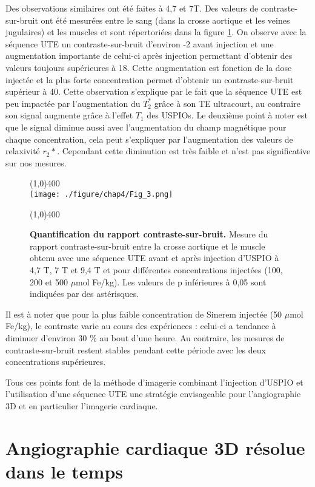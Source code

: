 Des observations similaires ont été faites à 4,7 et 7T. Des valeurs de contraste-sur-bruit ont été mesurées entre le sang (dans la crosse aortique et les veines jugulaires) et les muscles et sont répertoriées dans la figure \ref{fig:contraste-sur-bruitUteFlash}. On observe avec la séquence UTE un contraste-sur-bruit d'environ -2 avant injection et une augmentation importante de celui-ci après injection permettant d'obtenir des valeurs toujours supérieures à 18. Cette augmentation est fonction de la dose injectée et la plus forte concentration permet d'obtenir un contraste-sur-bruit supérieur à 40. Cette observation s'explique par le fait que la séquence UTE est peu impactée par l'augmentation du $T_2^*$ grâce à son TE ultracourt, au contraire son signal augmente grâce à l'effet $T_1$ des USPIOs.
Le deuxième point à noter est que le signal diminue aussi avec l'augmentation du champ magnétique pour chaque concentration, cela peut s'expliquer par l'augmentation des valeurs de relaxivité $r_2*$. Cependant cette diminution est très faible et n'est pas significative sur nos mesures.

\begin{figure}[H]
\centering
\line(1,0){400} \\
\texttt{[image: ./figure/chap4/Fig\_3.png]}
\caption[Quantification du rapport contraste-sur-bruit.]{\label{fig:contraste-sur-bruitUteFlash} \textbf{Quantification du rapport contraste-sur-bruit.} Mesure du rapport contraste-sur-bruit entre la crosse aortique et le muscle obtenu avec une séquence UTE avant et après injection d'USPIO à 4,7 T, 7 T et 9,4 T et pour différentes concentrations injectées (100, 200 et 500 $\mu$mol Fe/kg). Les valeurs de p inférieures à 0,05 sont indiquées par des astérisques.}
\line(1,0){400} \\ 
\end{figure}

Il est à noter que pour la plus faible concentration de Sinerem injectée (50 $\mu$mol Fe/kg), le contraste varie au cours des expériences : celui-ci a tendance à diminuer d'environ 30 $\%$ au bout d'une heure. Au contraire, les mesures de contraste-sur-bruit restent stables pendant cette période avec les deux concentrations supérieures. 

Tous ces points font de la méthode d'imagerie combinant l'injection d'USPIO et l'utilisation d'une séquence UTE une stratégie envisageable pour l'angiographie 3D et en particulier l'imagerie cardiaque.

\section{Angiographie cardiaque 3D résolue dans le temps}

